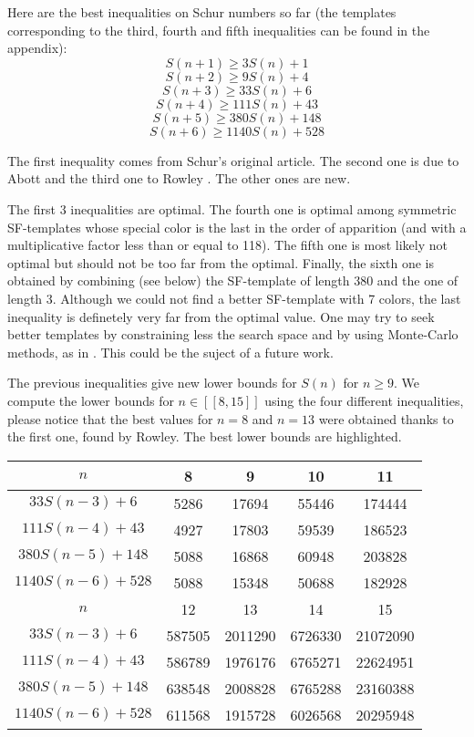 \par
Here are the best inequalities on Schur numbers so far (the templates corresponding to the third, fourth and fifth 
inequalities can be found in the appendix):
\[ S(n+1) \geqslant 3S(n) + 1 \]
\[ S(n+2) \geqslant 9S(n) + 4 \]
\[ S(n+3) \geqslant 33S(n) + 6 \]
\[ S(n+4) \geqslant 111S(n) + 43 \]
\[ S(n+5) \geqslant 380S(n) + 148 \]
\[ S(n+6) \geqslant 1140S(n) + 528 \]

The first inequality comes from  Schur's original article\cite{Schur1917}. The second one is due to
Abott \cite{AbbottHanson}
and the third one to Rowley \cite{RowleyRamsey}. The other ones are new.

\par
The first 3 inequalities are optimal. The fourth one is optimal among symmetric SF-templates whose special color is 
the last in the order of apparition (and with a multiplicative factor less than or equal to 118). The fifth one is most 
likely not optimal but should not be too far from the optimal. 
Finally, the sixth one is obtained by combining (see below) the SF-template of length 380 and the one of length 3. 
Although we could not find a better SF-template with 7 colors, the last inequality is definetely very far from the 
optimal value. One may try to seek better templates by constraining less the search space and by using 
Monte-Carlo methods, as in \cite{Bouzy2015AnAP}. This could be the suject of a future work.

\par
The previous inequalities give new lower bounds for \(S(n)\) for
\( n \geqslant 9 \). We compute the lower
bounds for \( n \in [\![8,15]\!] \) using the four different inequalities, please notice that the best values for \( n
=8\) and \(n = 13\) were obtained thanks to the first one, found by Rowley. The best lower bounds are highlighted.

\begin{center}
\begin{tabular}{|*{5}{c|}}
    \hline
	\(n\) & 8 & 9 & 10 & 11 \\
	\hline
	\(33S(n-3) + 6 \) & \cellcolor{yellow} 5286 & 17694 & 55446 & 174444\\
	\hline
	\(111S(n-4) + 43 \) & 4927 & \cellcolor{yellow} 17803 & 59539 & 186523\\
	\hline
	\(380S(n-5) + 148 \) & 5088 & 16868 & \cellcolor{yellow} 60948 & \cellcolor{yellow} 203828 \\
	\hline
	\(1140S(n-6) + 528 \) & 5088 & 15348 & 50688 & 182928\\
	\hline
	\hline
	\(n\) & 12 & 13 & 14 & 15 \\
	\hline
	\(33S(n-3) + 6 \) & 587505 & \cellcolor{yellow} 2011290 & 6726330 & 21072090\\
	\hline
	\(111S(n-4) + 43 \) & 586789 & 1976176 & 6765271 & 22624951 \\
	\hline
\(380S(n-5) + 148 \) & \cellcolor{yellow} 638548 & 2008828 & \cellcolor{yellow} 6765288 & \cellcolor{yellow} 23160388 \\\hline
	\(1140S(n-6) + 528 \) & 611568 & 1915728 & 6026568 & 20295948 \\
	\hline
\end{tabular}
\end{center}


